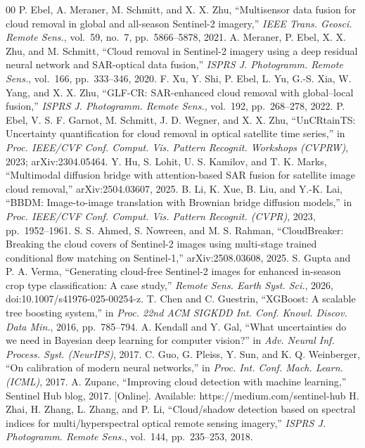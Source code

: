 \documentclass[conference]{IEEEtran}
\begin{document}
\begin{thebibliography}{00}
 P. Ebel, A. Meraner, M. Schmitt, and X. X. Zhu, ``Multisensor data
fusion for cloud removal in global and all-season Sentinel-2 imagery,'' \textit{IEEE Trans.
Geosci. Remote Sens.}, vol.~59, no.~7, pp.~5866--5878, 2021.
 A. Meraner, P. Ebel, X. X. Zhu, and M. Schmitt, ``Cloud removal in
Sentinel-2 imagery using a deep residual neural network and SAR-optical data fusion,''
\textit{ISPRS J. Photogramm. Remote Sens.}, vol.~166, pp.~333--346, 2020.
 F. Xu, Y. Shi, P. Ebel, L. Yu, G.-S. Xia, W. Yang, and X. X. Zhu, ``GLF-CR:
SAR-enhanced cloud removal with global--local fusion,'' \textit{ISPRS J. Photogramm. Remote
Sens.}, vol.~192, pp.~268--278, 2022.
 P. Ebel, V. S. F. Garnot, M. Schmitt, J. D. Wegner, and X. X. Zhu,
``UnCRtainTS: Uncertainty quantification for cloud removal in optical satellite time series,'' in
\textit{Proc. IEEE/CVF Conf. Comput. Vis. Pattern Recognit. Workshops (CVPRW)}, 2023;
arXiv:2304.05464.
 Y. Hu, S. Lohit, U. S. Kamilov, and T. K. Marks, ``Multimodal diffusion
bridge with attention-based SAR fusion for satellite image cloud removal,'' arXiv:2504.03607,
2025.
 B. Li, K. Xue, B. Liu, and Y.-K. Lai, ``BBDM: Image-to-image translation with
Brownian bridge diffusion models,'' in \textit{Proc. IEEE/CVF Conf. Comput. Vis. Pattern
Recognit. (CVPR)}, 2023, pp.~1952--1961.
 S. S. Ahmed, S. Nowreen, and M. S. Rahman, ``CloudBreaker:
Breaking the cloud covers of Sentinel-2 images using multi-stage trained conditional flow
matching on Sentinel-1,'' arXiv:2508.03608, 2025.
 S. Gupta and P. A. Verma, ``Generating cloud-free Sentinel-2 images
for enhanced in-season crop type classification: A case study,'' \textit{Remote Sens. Earth Syst.
Sci.}, 2026, doi:10.1007/s41976-025-00254-z.
 T. Chen and C. Guestrin, ``XGBoost: A scalable tree boosting system,'' in
\textit{Proc. 22nd ACM SIGKDD Int. Conf. Knowl. Discov. Data Min.}, 2016, pp.~785--794.
 A. Kendall and Y. Gal, ``What uncertainties do we need in
Bayesian deep learning for computer vision?'' in \textit{Adv. Neural Inf. Process. Syst.
(NeurIPS)}, 2017.
 C. Guo, G. Pleiss, Y. Sun, and K. Q. Weinberger, ``On calibration of
modern neural networks,'' in \textit{Proc. Int. Conf. Mach. Learn. (ICML)}, 2017.
 A. Zupanc, ``Improving cloud detection with machine learning,''
Sentinel Hub blog, 2017. [Online]. Available: https://medium.com/sentinel-hub
 H. Zhai, H. Zhang, L. Zhang, and P. Li, ``Cloud/shadow detection
based on spectral indices for multi/hyperspectral optical remote sensing imagery,'' \textit{ISPRS
J. Photogramm. Remote Sens.}, vol.~144, pp.~235--253, 2018.
\end{thebibliography}
\end{document}
